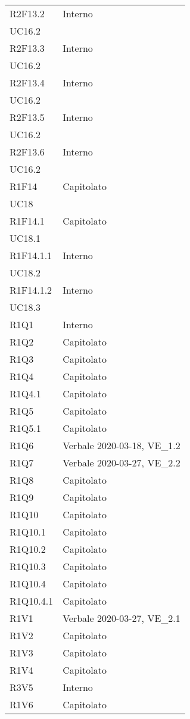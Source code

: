 \begin{longtable}{ 
		>{\centering}p{}
		>{\centering}p{}}
	R2F13.2	& Interno	\\ UC16.2 \tabularnewline
	R2F13.3	& Interno	\\ UC16.2 \tabularnewline
	R2F13.4	& Interno	\\ UC16.2 \tabularnewline
	R2F13.5	& Interno	\\ UC16.2 \tabularnewline
	R2F13.6	& Interno	\\ UC16.2 \tabularnewline
	R1F14	& Capitolato\\	UC18 \tabularnewline
	R1F14.1	& Capitolato\\	UC18.1 \tabularnewline
	R1F14.1.1 &	Interno	\\UC18.2 \tabularnewline
	R1F14.1.2 &	Interno	\\ UC18.3 \tabularnewline
	R1Q1 &	Interno	 \tabularnewline
	R1Q2 & 	Capitolato	 \tabularnewline
	R1Q3 & 	Capitolato \tabularnewline
	R1Q4 &	Capitolato \tabularnewline	
	R1Q4.1 &	Capitolato	\tabularnewline
	R1Q5 &	Capitolato	 \tabularnewline
	R1Q5.1 &	Capitolato	 \tabularnewline 
	R1Q6 &	Verbale 2020-03-18, VE\_1.2	\tabularnewline
	R1Q7 &	Verbale 2020-03-27, VE\_2.2	\tabularnewline
	R1Q8 & 	Capitolato	 \tabularnewline
	R1Q9 &	Capitolato	\tabularnewline
	R1Q10 &	Capitolato\tabularnewline
	R1Q10.1 & 	Capitolato\tabularnewline
	R1Q10.2	& Capitolato \tabularnewline
	R1Q10.3	& Capitolato \tabularnewline
	R1Q10.4	& Capitolato \tabularnewline
	R1Q10.4.1 &	Capitolato \tabularnewline
	R1V1 &	Verbale 2020-03-27, VE\_2.1 \tabularnewline
	R1V2 &	Capitolato \tabularnewline 
	R1V3 &	Capitolato \tabularnewline
	R1V4 &	Capitolato \tabularnewline
	R3V5 &	Interno \tabularnewline
	R1V6 &	Capitolato \tabularnewline

	
\end{longtable}	
